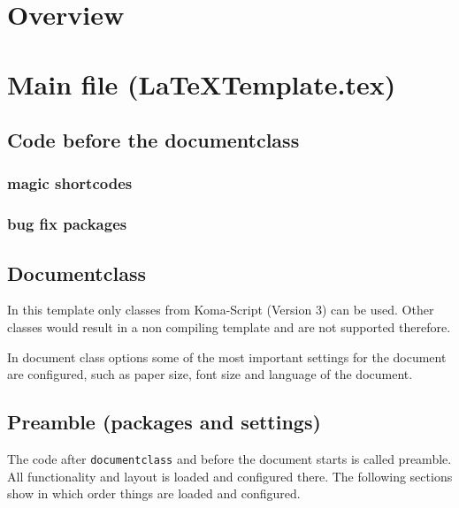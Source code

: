 
\chapter{Overview}

\chapter{Main file (LaTeXTemplate.tex)}

\section{Code before the documentclass}

\subsection{magic shortcodes}

\subsection{bug fix packages}

\section{Documentclass}
In this template only classes from Koma-Script (Version 3) can be used.
Other classes would result in a non compiling template and are not supported therefore. 

In document class options some of the most important settings for the document are configured, such as paper size, font size and language of the document.

\section{Preamble (packages and settings)}
The code after \texttt{documentclass} and before the document starts is called preamble. All functionality and layout is loaded and configured there. The following sections show in which order things are loaded and configured.

